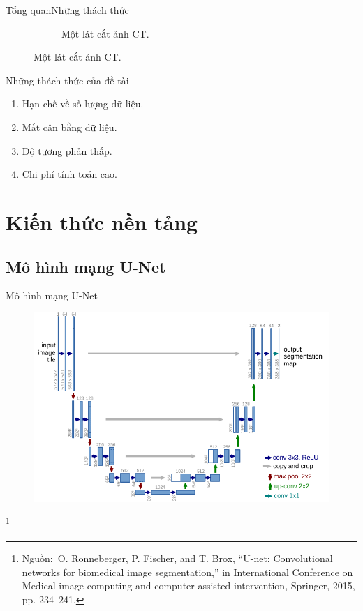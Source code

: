 \documentclass[
	10pt,                %
	aspectratio=169,     %
]{beamer}
\newcommand\footnotesource[1]{					%
	\vspace{-10mm}\let\thefootnote\relax\footnote{\hspace{-3mm}\tiny Nguồn:~#1}
}
\begin{document}
\begin{frame}{Tổng quan}{Những thách thức}
\begin{figure}[h!]
\begin{subfigure}[b]{0.45\textwidth}
				\caption{Một lát cắt ảnh CT.}
			\end{subfigure}
		\end{figure}
		\vspace{-3mm}
		\begin{block}{Những thách thức của đề tài}
			\begin{enumerate}
				\item Hạn chế về số lượng dữ liệu.
				\item Mất cân bằng dữ liệu.
				\item Độ tương phản thấp.
				\item Chi phí tính toán cao.
			\end{enumerate}
		\end{block}
	\end{frame}

\section{Kiến thức nền tảng}
\subsection{Mô hình mạng U-Net}
	\begin{frame}{Mô hình mạng U-Net}
		\begin{figure}
			\centering
			\vspace{-0.55cm}
			\includegraphics[scale=0.9]{figures/model_unet.pdf}
		\end{figure}
		\footnotesource{O. Ronneberger, P. Fischer, and T. Brox, ``U-net: Convolutional networks for biomedical image segmentation,'' in International Conference on Medical image computing and computer-assisted intervention, Springer, 2015, pp. 234–241.} 
	\end{frame}
	
\end{document}

